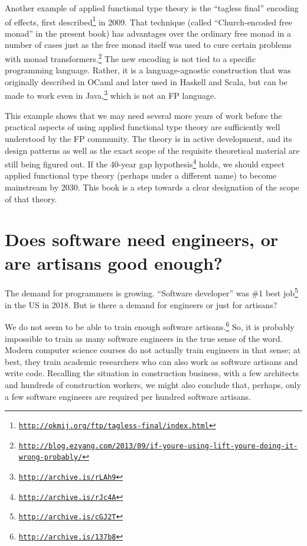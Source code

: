 Another example of applied functional type theory is the  \textsf{``}tagless
final\textsf{''} encoding of effects, first described\footnote{\texttt{\href{http://okmij.org/ftp/tagless-final/index.html}{http://okmij.org/ftp/tagless-final/index.html}}}
in 2009. That technique (called \textsf{``}Church-encoded free monad\textsf{''}
in the present book) has advantages over the ordinary free monad in
a number of cases \textemdash{} just as the free monad itself was
used to cure certain problems with monad transformers.\footnote{\texttt{\href{http://blog.ezyang.com/2013/09/if-youre-using-lift-youre-doing-it-wrong-probably/}{http://blog.ezyang.com/2013/09/if-youre-using-lift-youre-doing-it-wrong-probably/}}}
The new encoding is not tied to a specific programming language. Rather,
it is a language-agnostic construction that was originally described
in OCaml and later used in Haskell and Scala, but can be made to work
even in Java,\footnote{\texttt{\href{http://archive.is/rLAh9}{http://archive.is/rLAh9}}}
which is not an FP language.

This example shows that we may need several more years of work before
the practical aspects of using applied functional type theory are
sufficiently well understood by the FP community. The theory is in
active development, and its design patterns \textemdash{} as well
as the exact scope of the requisite theoretical material \textemdash{}
are still being figured out. If the 40-year gap hypothesis\footnote{\texttt{\href{http://archive.is/rJc4A}{http://archive.is/rJc4A}}}
holds, we should expect applied functional type theory (perhaps under
a different name) to become mainstream by 2030. This book is a step
towards a clear designation of the scope of that theory.

\section{Does software need engineers, or are artisans good enough? }

The demand for programmers is growing. \textsf{``}Software developer\textsf{''} was
\#1 best job\footnote{\texttt{\href{http://archive.is/cGJ2T}{http://archive.is/cGJ2T}}}
in the US in 2018. But is there a demand for engineers or just for
artisans?

We do not seem to be able to train enough software artisans.\footnote{\texttt{\href{http://archive.is/137b8}{http://archive.is/137b8}}}
So, it is probably impossible to train as many software engineers
in the true sense of the word. Modern computer science courses do
not actually train engineers in that sense; at best, they train academic
researchers who can also work as software artisans and write code.
Recalling the situation in construction business, with a few architects
and hundreds of construction workers, we might also conclude that,
perhaps, only a few software engineers are required per hundred software
artisans.

